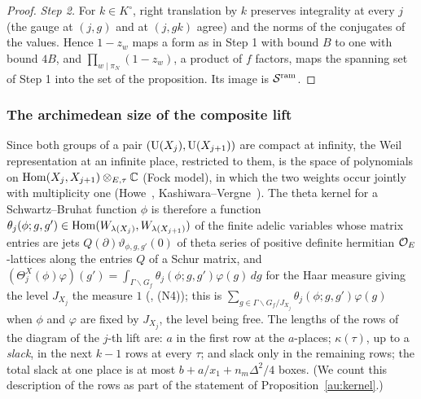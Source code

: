 \documentclass[10pt]{amsart}
\theoremstyle{definition}
\theoremstyle{remark}
\newcommand{\C}{\mathbb C}
\begin{document}
\begin{proof}
\emph{Step 2.} For $k\in K^\circ$, right translation by $k$ preserves integrality at every $j$
(the gauge at $(j,g)$ and at $(j,gk)$ agree) and the norms of the conjugates of the values. Hence
$1-z_w$ maps a form as in Step 1 with bound $B$ to one with bound $4B$, and
$\prod_{w\mid\pi_N}(1-z_w)$, a product of $f$ factors, maps the spanning set of Step 1 into the
set of the proposition. Its image is $\mathcal S^{\mathrm{ram}}$.
\end{proof}

\subsubsection*{The archimedean size of the composite lift}\label{ss:au-size}

Since both groups of a pair $(\mathrm U(X_j),\mathrm U(X_{j+1}))$ are compact at infinity, the Weil
representation at an infinite place, restricted to them, is the space of polynomials on
$\auHom(X_j,X_{j+1})\otimes_{E,\tau}\C$ (Fock model), in which the two weights occur jointly with
multiplicity one (Howe~\cite{HoweTheta}, Kashiwara--Vergne~\cite[Ch.~III, Proposition~5.6]{KashiwaraVergne}). The theta
kernel for a Schwartz--Bruhat function $\phi$ is therefore a function
$\theta_j(\phi;g,g')\in\operatorname{Hom}(W_{\lambda(X_j)},W_{\lambda(X_{j+1})})$ of the finite adelic
variables whose matrix entries are jets $Q(\partial)\vartheta_{\phi,g,g'}(0)$ of theta series of
positive definite hermitian $\mathcal O_E$-lattices along the entries $Q$ of a Schur matrix, and
$(\Theta^X_j(\phi)\varphi)(g')=\int_{\Gamma\backslash G_f}\theta_j(\phi;g,g')\varphi(g)\,dg$ for the
Haar measure giving the level $J_{X_j}$ the measure $1$ ({\cite[\S6.1]{P49}}, (N4)); this is
$\sum_{g\in\Gamma\backslash G_f/J_{X_j}}\theta_j(\phi;g,g')\varphi(g)$ when $\phi$ and $\varphi$ are
fixed by $J_{X_j}$, the level being free. The lengths of the rows of the diagram of the $j$-th lift are: $a$ in
the first row at the $a$-places; $\kappa(\tau)$, up to a \emph{slack}, in the next $k-1$ rows at
every $\tau$; and slack only in the remaining rows; the total slack at one place is at most
$b+a/x_1+n_m\Delta^2/4$ boxes. (We count this description of the rows as part of
the statement of Proposition~\ref{au:kernel}.)
\end{document}
